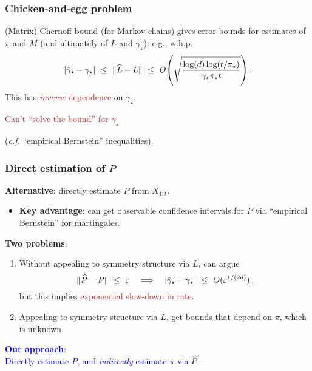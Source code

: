 \documentclass[11pt,compress,blue4]{beamer}
\newcommand{\BLUE}[1]{\textcolor{blue}{#1}}
\newcommand{\FIREBRICK}[1]{\textcolor{firebrick}{#1}}
\newcommand\fns\footnotesize
\newcommand\pimin{\ensuremath{\pi_{\star}}}
\newcommand\gap{\ensuremath{\gamma_{\star}}}
\newcommand\gaphat{\ensuremath{\hat{\gamma}_{\star}}}
\begin{document}

\begin{frame}
  \frametitle{Chicken-and-egg problem}

  (Matrix) Chernoff bound {\fns(for Markov chains)} gives error bounds
  for estimates of $\pi$ and $M$ (and ultimately of $L$ and $\gap$):
  e.g., w.h.p.,
  \[
    \abs{\gaphat-\gap}
    \ \leq \
    \norm{\wh L - L}
    \ \leq \
    O\Parens{
      \sqrt{\frac{\log(d)\log(t/\pimin)}{\gap\pimin t}}
    }
    \,.
  \]
  \onslide<2->
  This has \FIREBRICK{\emph{inverse} dependence} on $\gap$.

  \begin{center}
    \FIREBRICK{%
      Can't ``solve the bound'' for $\gap$
    }

    {\fns(\emph{c.f.} ``empirical Bernstein'' inequalities)}.
  \end{center}

\end{frame}


\begin{frame}
  \frametitle{Direct estimation of $P$}

  \textbf{Alternative}: directly estimate $P$ from $X_{1:t}$.

  \begin{itemize}
    \item<2->
      \textbf{Key advantage}: can get observable confidence intervals
      for $P$ via ``empirical Bernstein'' for martingales.

  \end{itemize}

  \textbf{Two problems}:
  \begin{enumerate}
    \item<4->
      Without appealing to symmetry structure via $L$, can argue
      \[
        \norm{\wh{P} - P} \ \leq \ \veps
        \quad\Longrightarrow\quad
        \abs{\gaphat - \gap} \ \leq \ O(\veps^{1/(2d)})
        \,,
      \]
      but this implies \FIREBRICK{exponential slow-down in rate}.

      \medskip

    \item<5->
      Appealing to symmetry structure via $L$, get bounds that depend
      on $\pi$, which is unknown.

  \end{enumerate}

  \begin{center}
    \BLUE{%
      \textbf{Our approach}: \\
      Directly estimate $P$, and \emph{indirectly} estimate $\pi$ via
      $\widehat P$.
    }
  \end{center}

\end{frame}
\end{document}
